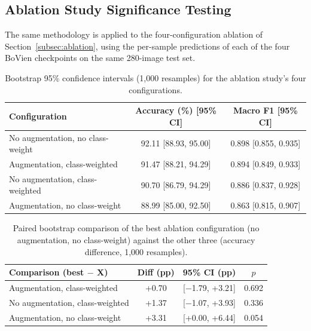 \subsection{Ablation Study Significance Testing}
\label{app:bootstrap_ablation}

The same methodology is applied to the four-configuration ablation of Section~\ref{subsec:ablation}, using the per-sample predictions of each of the four BoVien checkpoints on the same 280-image test set.

\begin{table}[htbp]
\centering
\caption{Bootstrap 95\% confidence intervals (1,000 resamples) for the ablation study's four configurations.}
\label{tab:ablation_bootstrap_ci}
\small
\setlength{\tabcolsep}{4pt}
\begin{tabular}{lcc}
\toprule
\textbf{Configuration} & \textbf{Accuracy (\%) [95\% CI]} & \textbf{Macro F1 [95\% CI]} \\
\midrule
No augmentation, no class-weight & 92.11 [88.93, 95.00] & 0.898 [0.855, 0.935] \\
Augmentation, class-weighted     & 91.47 [88.21, 94.29] & 0.894 [0.849, 0.933] \\
No augmentation, class-weighted  & 90.70 [86.79, 94.29] & 0.886 [0.837, 0.928] \\
Augmentation, no class-weight    & 88.99 [85.00, 92.50] & 0.863 [0.815, 0.907] \\
\bottomrule
\end{tabular}
\end{table}

\begin{table}[htbp]
\centering
\caption{Paired bootstrap comparison of the best ablation configuration (no augmentation, no class-weight) against the other three (accuracy difference, 1,000 resamples).}
\label{tab:ablation_bootstrap_pairwise}
\small
\setlength{\tabcolsep}{4pt}
\begin{tabular}{lccc}
\toprule
\textbf{Comparison (best $-$ X)} & \textbf{Diff (pp)} & \textbf{95\% CI (pp)} & \textbf{$p$} \\
\midrule
Augmentation, class-weighted    & +0.70 & [$-$1.79, +3.21] & 0.692 \\
No augmentation, class-weighted & +1.37 & [$-$1.07, +3.93] & 0.336 \\
Augmentation, no class-weight   & +3.31 & [+0.00, +6.44]   & 0.054 \\
\bottomrule
\end{tabular}
\end{table}

